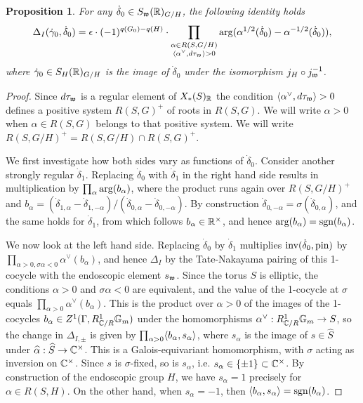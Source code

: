\documentclass{article}
\newtheorem{pro}[thm]{Proposition}
\theoremstyle{definition}
\numberwithin{equation}{section}
\renewcommand{\-}{\hyp{}}
\begin{document}
\begin{pro} \label{pro:magic}
For any $\dot\delta_0 \in S_{\mathfrak{w}}(\mathbb{R})_{G/H}$, the following identity holds
\[  \Delta_{I}(\dot\gamma_0,\dot\delta_0) = \epsilon\cdot(-1)^{q(G_0)-q(H)}\cdot\prod_{\substack{\alpha \in R(S,G/H)\\ \langle\alpha^\vee,d\tau_{\mathfrak{w}}\rangle>0}}\arg(\alpha^{1/2}(\dot\delta_0) - \alpha^{-1/2}(\dot\delta_0)), \]
where $\dot\gamma_0 \in S_H(\mathbb{R})_{G/H}$ is the image of $\dot\delta_0$ under the isomorphism $j_H \circ j_{\mathfrak{w}}^{-1}$.
\end{pro}
\begin{proof}
Since $d\tau_{\mathfrak{w}}$ is a regular element of $X_*(S)_{\mathbb{R}}$ the condition $\langle\alpha^\vee,d\tau_{\mathfrak{w}}\rangle>0$ defines a positive system $R(S,G)^+$ of roots in $R(S,G)$. We will write $\alpha>0$ when $\alpha \in R(S,G)$ belongs to that positive system. We will write $R(S,G/H)^+ = R(S,G/H) \cap R(S,G)^+$.

	We first investigate how both sides vary as functions of $\dot\delta_0$. Consider another strongly regular $\dot\delta_1$. Replacing $\dot\delta_0$ with $\dot\delta_1$ in the right hand side results in multiplication by $\prod_\alpha \textrm{arg}(b_\alpha)$, where the product runs again over $R(S,G/H)^+$ and $b_\alpha=(\dot\delta_{1,\alpha}-\dot\delta_{1,-\alpha})/(\dot\delta_{0,\alpha}-\dot\delta_{0,-\alpha})$. By construction $\dot\delta_{0,-\alpha}=\sigma(\dot\delta_{0,\alpha})$, and the same holds for $\dot\delta_1$, from which follows $b_\alpha \in \mathbb{R}^\times$, and hence $\textrm{arg}(b_\alpha)=\textrm{sgn}(b_\alpha)$.

We now look at the left hand side. Replacing $\dot\delta_0$ by $\dot\delta_1$ multiplies $\textrm{inv}(\dot\delta_0,\textrm{pin})$ by $\prod_{\alpha>0,\sigma\alpha<0}\alpha^\vee(b_\alpha)$, and hence $\Delta_{I}$ by the Tate-Nakayama pairing of this 1-cocycle with the endoscopic element $s_{\mathfrak{w}}$. Since the torus $S$ is elliptic, the conditions $\alpha>0$ and $\sigma\alpha<0$ are equivalent, and the value of the 1-cocycle at $\sigma$ equals $\prod_{\alpha>0}\alpha^\vee(b_\alpha)$. This is the product over $\alpha>0$ of the images of the 1-cocycles $b_\alpha \in Z^1(\Gamma,R_{\mathbb{C}/R}^1\mathbb{G}_m)$ under the homomorphisms $\alpha^\vee : R_{\mathbb{C}/R}^1\mathbb{G}_m \to S$, so the change in $\Delta_{I,\pm}$ is given by $\prod_{\alpha>0}\langle b_\alpha,s_\alpha\rangle$, where $s_\alpha$ is the image of $s \in \hat S$ under $\widehat\alpha : \widehat S \to \mathbb{C}^\times$. This is a Galois-equivariant homomorphism, with $\sigma$ acting as inversion on $\mathbb{C}^\times$. Since $s$ is $\sigma$-fixed, so is $s_\alpha$, i.e. $s_\alpha \in \{\pm1\} \subset \mathbb{C}^\times$. By construction of the endoscopic group $H$, we have $s_\alpha=1$ precisely for $\alpha \in R(S,H)$. On the other hand, when $s_\alpha=-1$, then $\langle b_\alpha,s_\alpha\rangle=\textrm{sgn}(b_\alpha)$.


\end{proof}
\end{document}
